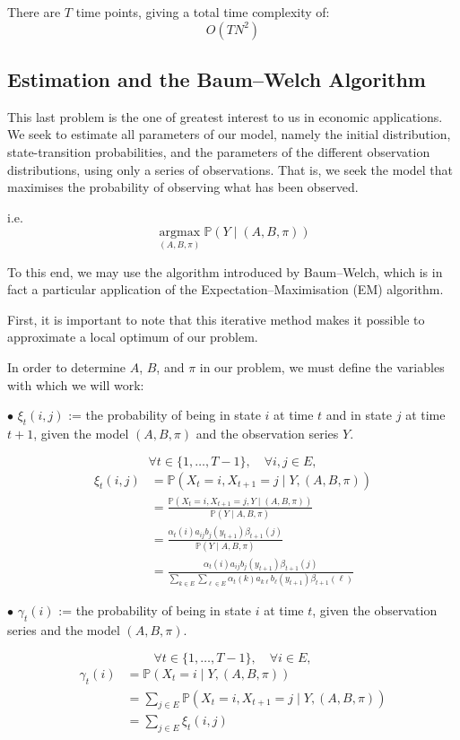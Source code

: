 \documentclass[11pt]{article}
\begin{document}
There are $T$ time points, giving a total time complexity of:
\[
O(TN^2)
\]


\subsection{Estimation and the Baum--Welch Algorithm}

This last problem is the one of greatest interest to us in economic applications.
We seek to estimate all parameters of our model, namely the initial distribution, state-transition probabilities, and the parameters of the different observation distributions, using only a series of observations.
That is, we seek the model that maximises the probability of observing what has been observed.

i.e.
\[
\operatorname*{argmax}_{(A,B,\pi)} \mathbb{P}(Y \mid (A,B,\pi))
\]

To this end, we may use the algorithm introduced by Baum--Welch, which is in fact a particular application of the Expectation--Maximisation (EM) algorithm.

First, it is important to note that this iterative method makes it possible to approximate a local optimum of our problem.

In order to determine $A$, $B$, and $\pi$ in our problem, we must define the variables with which we will work:

\textbf{$\bullet$} $\xi_t(i,j)$ := the probability of being in state $i$ at time $t$ and in state $j$ at time $t+1$, given the model $(A,B,\pi)$ and the observation series $Y$.

\[
\forall t \in \{1,\dots,T-1\}, \quad \forall i,j \in E,
\]
\begin{align*}
\xi_t(i,j) 
&= \mathbb{P}(X_t=i,X_{t+1}=j \mid Y,(A,B,\pi)) \\
&= \frac{\mathbb{P}(X_t=i,X_{t+1}=j,Y \mid (A,B,\pi))}
{\mathbb{P}(Y \mid A,B,\pi)} \\
&= \frac{\alpha_t(i)a_{ij}b_j(y_{t+1})\beta_{t+1}(j)}
{\mathbb{P}(Y \mid A,B,\pi)} \\
&= \frac{\alpha_t(i)a_{ij}b_j(y_{t+1})\beta_{t+1}(j)}
{\sum_{k \in E}\sum_{\ell \in E}\alpha_t(k)a_{k\ell}b_\ell(y_{t+1})\beta_{t+1}(\ell)}
\end{align*}

\newpage
\textbf{$\bullet$} $\gamma_t(i)$ := the probability of being in state $i$ at time $t$, given the observation series and the model $(A,B,\pi)$.

\[
\forall t \in \{1,\dots,T-1\}, \quad \forall i \in E,
\]
\begin{align*}
\gamma_t(i) 
&= \mathbb{P}(X_t=i \mid Y,(A,B,\pi)) \\
&= \sum_{j \in E}\mathbb{P}(X_t=i,X_{t+1}=j \mid Y,(A,B,\pi)) \\
&= \sum_{j \in E}\xi_t(i,j)
\end{align*}
\end{document}
